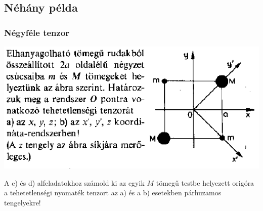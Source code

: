 \documentclass[12pt,a4paper]{scrartcl}
\begin{document}
\subsection{Néhány példa}
\subsubsection{Négyféle tenzor}
\includegraphics[scale=0.8]{lusta/merev_test1pelda.png}

A c) és d) alfeladatokhoz számold ki az egyik $M$ tömegű testbe helyezett origóra a tehetetlenségi nyomaték tenzort az a) és a b) esetekben párhuzamos tengelyekre!
\end{document}
